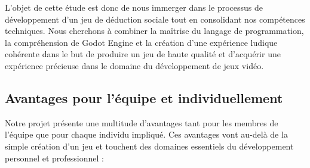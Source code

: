 \documentclass[
	article,			%
	11pt,				%
	oneside,			%
	a4paper,			%
	chapter=TITLE,
	french,			%
	sumario=tradicional
	]{base_nt}
\begin{document}
L'objet de cette étude est donc de nous immerger dans le processus de développement d'un jeu de déduction sociale tout en consolidant nos compétences techniques. Nous cherchons à combiner la maîtrise du langage de programmation, la compréhension de Godot Engine et la création d'une expérience ludique cohérente dans le but de produire un jeu de haute qualité et d'acquérir une expérience précieuse dans le domaine du développement de jeux vidéo.

\subsection{Avantages pour l'équipe et individuellement}

Notre projet présente une multitude d'avantages tant pour les membres de l'équipe que pour chaque individu impliqué. Ces avantages vont au-delà de la simple création d'un jeu et touchent des domaines essentiels du développement personnel et professionnel :
\end{document}
